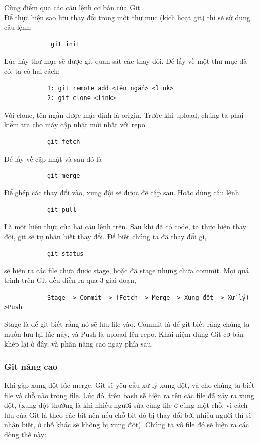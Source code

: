 \documentclass[12pt,a4paper]{report}
\begin{document}
		Cùng điểm qua các câu lệnh cơ bản của Git.\\
		Để thực hiện sao lưu thay đổi trong một thư mục (kích hoạt git) thì sẽ sử dụng câu lệnh:
		\begin{verbatim}
		     git init
		\end{verbatim}
		Lúc này thư mục sẽ được git quan sát các thay đổi.
		Để lấy về một thư mục đã có, ta có hai cách:
		\begin{verbatim}
		    1: git remote add <tên ngắn> <link>
		    2: git clone <link>
		\end{verbatim}
		Với clone, tên ngắn được mặc định là origin.
		Trước khi upload, chúng ta phải kiểm tra cho máy cập nhật mới nhất với repo.
		\begin{verbatim}
		    git fetch 
		\end{verbatim}
		Để lấy về cập nhật và sau đó là
		\begin{verbatim}
		    git merge
		\end{verbatim}
		Để ghép các thay đổi vào, xung đội sẽ được đề cập sau.
		Hoặc dùng câu lệnh
		\begin{verbatim}
		    git pull
		\end{verbatim}
		Là một hiện thực của hai câu lệnh trên.
		Sau khi đã có code, ta thực hiện thay đôi, git sẽ tự nhận biết thay đổi. Để biết chúng ta đã thay đổi gì,
		\begin{verbatim}
		    git status
		\end{verbatim}
		sẽ hiện ra các file chưa được stage, hoặc đã stage nhưng chưa commit.
		Mọi quá trình trên Git đều diễn ra qua 3 giai đoạn,
		\begin{verbatim}
		    Stage -> Commit -> (Fetch -> Merge -> Xung đột -> Xử lý) ->Push
		\end{verbatim}
		Stage là để git biết rằng nó sẽ lưu file vào. Commit là để git biết rằng chúng ta muốn lưu lại lúc này, và Push là upload lên repo.
		Khái niệm dùng Git cơ bản khép lại ở đây, và phần nâng cao ngay phía sau.

		\subsubsection{Git nâng cao}
		Khi gặp xung đột lúc merge. Git sẽ yêu cầu xử lý xung đột, và cho chúng ta biết file và chỗ nào trong file. Lúc đó, trên bash sẽ hiện ra tên các file đã xảy ra xung đột, (xung đột thường là khi nhiều người sửa cùng file ở cùng một chỗ, vì cách lưu của Git là theo các bit nên nếu chỗ bit đó bị thay đổi bởi nhiều người thì sẽ nhận biết, ở chỗ khác sẽ không bị xung đột). Chúng ta vô file đó sẽ hiện ra các dòng thế này:\par
\end{document}
